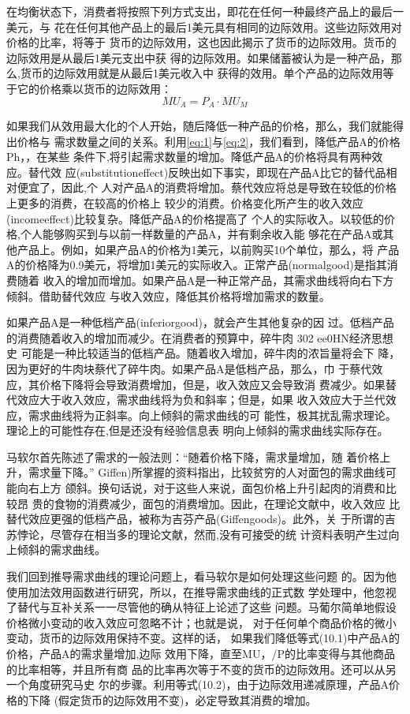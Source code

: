 在均衡状态下，消费者将按照下列方式支出，即花在任何一种最终产品上的最后一美元，与
花在任何其他产品上的最后1美元具有相同的边际效用。这些边际效用对价格的比率，将等于
货币的边际效用，这也因此揭示了货币的边际效用。货币的边际效用是从最后1美元支出中获
得的边际效用。如果储蓄被认为是一种产品，那么,货币的边际效用就是从最后1美元收入中
获得的效用。单个产品的边际效用等于它的价格乘以货币的边际效用：
\begin{equation}
  \label{eq:2}
  MU_A = P_A \cdot MU_M
\end{equation}

如果我们从效用最大化的个人开始，随后降低一种产品的价格，那么，我们就能得出价格与
需求数量之间的关系。利用\cref{eq:1}与\cref{eq:2}，我们看到，降低产品A的价格Ph，，在某些
条件下,将引起需求数量的增加。降低产品A的价格将具有两种效应。替代效
应(substitutioneffect)反映出如下事实，即现在产品A比它的替代品相对便宜了，因此,个
人对产品A的消费将增加。蔡代效应将总是导致在较低的价格上更多的消费，在较高的价格上
较少的消费。价格变化所产生的收入效应(incomeeffect)比较复杂。降低产品A的价格提高了
个人的实际收入。以较低的价格,个人能够购买到与以前一样数量的产品A，并有剩余收入能
够花在产品A或其他产品上。例如，如果产品A的价格为1美元，以前购买10个单位，那么，将
产品A的价格降为0.9美元，将增加1美元的实际收入。正常产品(normalgood)是指其消费随着
收入的增加而增加。如果产品A是一种正常产品，其需求曲线将向右下方倾斜。借助替代效应
与收入效应，降低其价格将增加需求的数量。

如果产品A是一种低档产品(inferiorgood)，就会产生其他复杂的因
过。低档产品的消费随着收入的增加而减少。在消费者的预算中，碎牛肉
302
ee0HN经济思想史
可能是一种比较适当的低档产品。随着收入增加，碎牛肉的浓旨量将会下
降，因为更好的牛肉块蔡代了碎牛肉。如果产品A是低档产品，那么，巾
于蔡代效应，其价格下降将会导致消费增加，但是，收入效应又会导致消
费减少。如果替代效应大于收入效应，需求曲线将为负和斜率；但是，如果
收入效应大于兰代效应，需求曲线将为正斜率。向上倾斜的需求曲线的可
能性，极其扰乱需求理论。理论上的可能性存在,但是还没有经验信息表
明向上倾斜的需求曲线实际存在。

马软尔首先陈述了需求的一般法则：“随着价格下降，需求量增加，随
着价格上升，需求量下降。”%
Giffen)所掌握的资料指出，比较贫穷的人对面包的需求曲线可能向右上方
颌斜。换句话说，对于这些人来说，面包价格上升引起肉的消费和比较昂
贵的食物的消费减少，面包的消费增加。因此，在理论文献中，收入效应
比替代效应更强的低档产品，被称为吉芬产品(Giffengoods)。此外，关
于所谓的吉苏悖论，尽管存在相当多的理论文献，然而,没有可接受的统
计资料表明产生过向上倾斜的需求曲线。

我们回到推导需求曲线的理论问题上，看马软尔是如何处理这些问题
的。因为他使用加法效用函数进行研究，所以，在推导需求曲线的正式数
学处理中，他忽视了替代与互补关系一一尽管他的确从特征上论述了这些
问题。马葡尔简单地假设价格微小变动的收入效应可忽略不计；也就是说，
对于任何单个商品价格的微小变动，货币的边际效用保持不变。这样的话，
如果我们降低等式(10.1)中产品A的价格，产品A的需求量增加,边际
效用下降，直至MU，/P的比率变得与其他商品的比率相等，并且所有商
品的比率再次等于不变的货币的边际效用。还可以从另一个角度研究马史
尔的步骤。利用等式(10.2)，由于边际效用递减原理，产品A价格的下降
(假定货币的边际效用不变)，必定导致其消费的增加。

